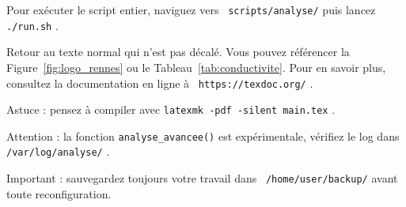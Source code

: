 \documentclass[12pt,a4paper]{report}
\newcommand{\inlinecode}[1]{%
  \colorbox{inlineCodeBg}{%
    \lstinline[basicstyle=\ttfamily\small\color{inlineCodeText}]!#1!%
  }%
}
\newcommand{\filepath}[1]{%
  \colorbox{pathBg}{%
    \lstinline[basicstyle=\ttfamily\small\color{pathText}]!#1!%
  }%
}
\newcommand{\folderpath}[1]{%
  \colorbox{pathBg}{%
    \textcolor{folderColor}{\faFolder}\,%
    \lstinline[basicstyle=\ttfamily\small\color{pathText}]!#1!%
  }%
}
\newcommand{\urlpath}[1]{%
  \colorbox{urlBg}{%
    \textcolor{linkColor}{\faLink}\,%
    \lstinline[basicstyle=\ttfamily\small\color{urlText}]!#1!%
  }%
}
\begin{document}
\begin{InfoBox}
Pour exécuter le script entier, naviguez vers \folderpath{scripts/analyse/} puis lancez \filepath{./run.sh}.
\end{InfoBox}

Retour au texte normal qui n'est pas décalé. Vous pouvez référencer la Figure~\ref{fig:logo_rennes} ou le Tableau~\ref{tab:conductivite}. 
Pour en savoir plus, consultez la documentation en ligne à \urlpath{https://texdoc.org/}.

\begin{TipBox}
Astuce : pensez à compiler avec \filepath{latexmk -pdf -silent main.tex}.
\end{TipBox}

\begin{WarningBox}
Attention : la fonction \inlinecode{analyse_avancee()} est expérimentale, vérifiez le log dans \folderpath{/var/log/analyse/}.
\end{WarningBox}

\begin{ImportantBox}
Important : sauvegardez toujours votre travail dans \folderpath{/home/user/backup/} avant toute reconfiguration.
\end{ImportantBox}
\end{document}
